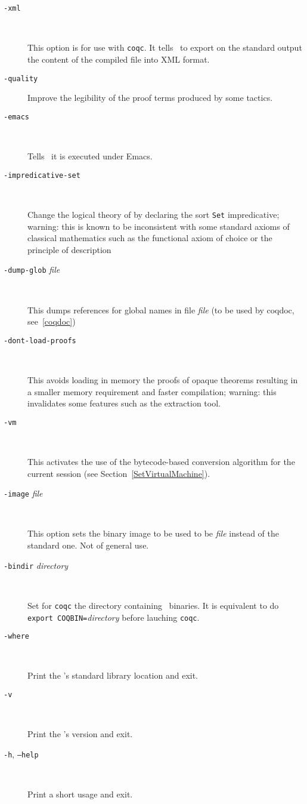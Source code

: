 \begin{description}
\item[{\tt -xml}]\ 

  This option is for use with {\tt coqc}. It tells \Coq\ to export on
  the standard output the content of the compiled file into XML format.

\item[{\tt -quality}]

  Improve the legibility of the proof terms produced by some tactics.

\item[{\tt -emacs}]\ 

  Tells \Coq\ it is executed under Emacs.

\item[{\tt -impredicative-set}]\ 

  Change the logical theory of {\Coq} by declaring the sort {\tt Set}
  impredicative; warning: this is known to be inconsistent with
  some standard axioms of classical mathematics such as the functional
  axiom of choice or the principle of description

\item[{\tt -dump-glob} {\em file}]\

  This dumps references for global names in file {\em file}
  (to be used by coqdoc, see~\ref{coqdoc})
 
\item[{\tt -dont-load-proofs}]\ 

  This avoids loading in memory the proofs of opaque theorems
  resulting in a smaller memory requirement and faster compilation;
  warning: this invalidates some features such as the extraction tool.

\item[{\tt -vm}]\ 

  This activates the use of the bytecode-based conversion algorithm
  for the current session (see Section~\ref{SetVirtualMachine}).

\item[{\tt -image} {\em file}]\ 

  This option sets the binary image to be used to be {\em file}
  instead of the standard one. Not of general use.

\item[{\tt -bindir} {\em directory}]\ 

  Set for {\tt coqc} the directory containing \Coq\ binaries.
  It is equivalent to do \texttt{export COQBIN=}{\em directory}
  before lauching {\tt coqc}.

\item[{\tt -where}]\ 

  Print the \Coq's standard library location and exit.

\item[{\tt -v}]\ 

  Print the \Coq's version and exit.

\item[{\tt -h}, {\tt --help}]\ 

  Print a short usage and exit.

\end{description}


